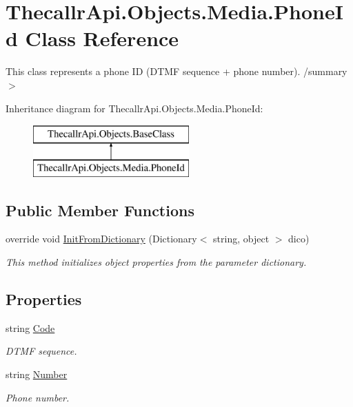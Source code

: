 \hypertarget{class_thecallr_api_1_1_objects_1_1_media_1_1_phone_id}{\section{Thecallr\+Api.\+Objects.\+Media.\+Phone\+Id Class Reference}
\label{class_thecallr_api_1_1_objects_1_1_media_1_1_phone_id}
}


This class represents a phone I\+D (D\+T\+M\+F sequence + phone number). /summary$>$  


Inheritance diagram for Thecallr\+Api.\+Objects.\+Media.\+Phone\+Id\+:\begin{figure}[H]
\begin{center}
\leavevmode
\includegraphics[height=2.000000cm]{class_thecallr_api_1_1_objects_1_1_media_1_1_phone_id}
\end{center}
\end{figure}
\subsection*{Public Member Functions}
\begin{DoxyCompactItemize}
\item 
override void \hyperlink{class_thecallr_api_1_1_objects_1_1_media_1_1_phone_id_ae89e41468645fa894e85ffa7b372e557}{Init\+From\+Dictionary} (Dictionary$<$ string, object $>$ dico)
\begin{DoxyCompactList}\small\item\em This method initializes object properties from the parameter dictionary. \end{DoxyCompactList}\end{DoxyCompactItemize}
\subsection*{Properties}
\begin{DoxyCompactItemize}
\item 
string \hyperlink{class_thecallr_api_1_1_objects_1_1_media_1_1_phone_id_a55e03afd5bd25a240e3881b60397ab0e}{Code}
\begin{DoxyCompactList}\small\item\em D\+T\+M\+F sequence. \end{DoxyCompactList}\item 
string \hyperlink{class_thecallr_api_1_1_objects_1_1_media_1_1_phone_id_a34b68bec0423786e356ee0f1d0db1630}{Number}
\begin{DoxyCompactList}\small\item\em Phone number. \end{DoxyCompactList}\end{DoxyCompactItemize}


